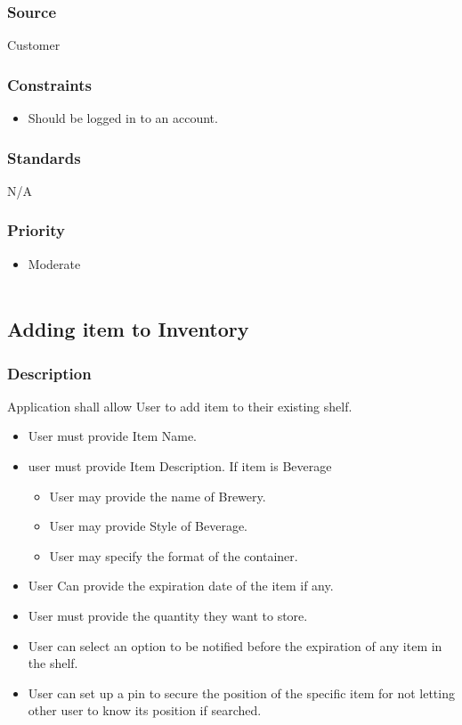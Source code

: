 \subsubsection{Source}
Customer
\subsubsection{Constraints}
\begin{itemize}
\item Should be logged in to an account.
\end{itemize}
\subsubsection{Standards}
N/A
\subsubsection{Priority}
\begin{itemize}
\item Moderate \\ \\
\end{itemize}

\subsection{Adding item to Inventory}
\subsubsection{Description}
Application shall allow User to add item to their existing shelf.
\begin{itemize}
\item User must provide Item Name.
\item user must provide Item Description.
 If item is Beverage
\begin{itemize}
\item User may provide the name of Brewery.
\item User may provide Style of Beverage.
\item User may specify the format of the container.
\end{itemize}
\item User Can provide the expiration date of the item if any.
\item User must provide the quantity they want to store.
\item User can select an option to be notified before the expiration of any item in the shelf.
\item User can set up a pin to secure the position of the specific item for not letting other user to know its position if searched.
\end{itemize}

